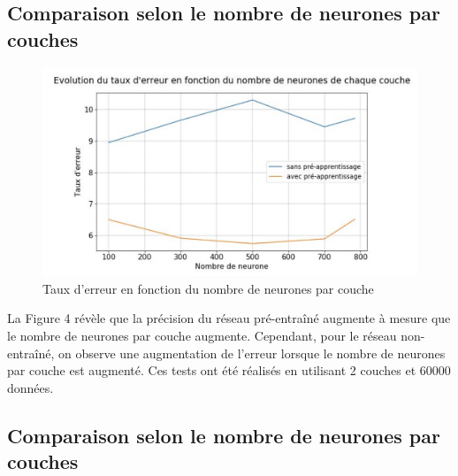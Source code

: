 \subsection{Comparaison selon le nombre de neurones par couches}

\begin{figure}[H]\includegraphics[width=140mm]
{images/graph1.png}
\caption{Taux d'erreur en fonction du nombre de neurones par couche}
\end{figure}
La Figure 4 révèle que la précision du réseau pré-entraîné augmente à mesure que le nombre de neurones par couche augmente. Cependant, pour le réseau non-entraîné, on observe une augmentation de l'erreur lorsque le nombre de neurones par couche est augmenté. Ces tests ont été réalisés en utilisant 2 couches et 60000 données.

\subsection{Comparaison selon le nombre de neurones par couches}

